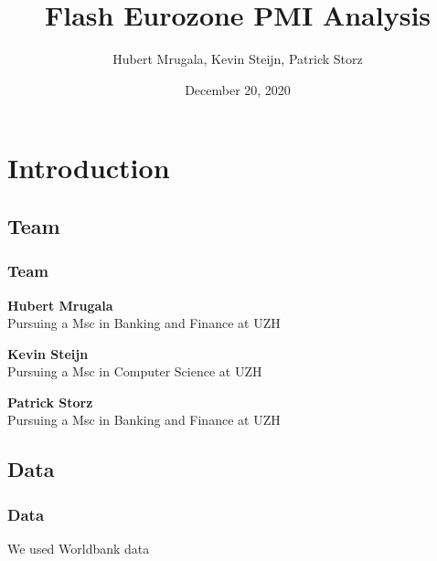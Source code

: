 \documentclass[10pt]{beamer}
\begin{document}
\title{Flash Eurozone PMI Analysis}
\author{Hubert Mrugala, Kevin Steijn, Patrick Storz}
\date{December 20, 2020} %

\begin{frame}
\titlepage
\end{frame}
\section{Introduction}
\begin{frame}
\subsection{Team}
\frametitle{Team}

\textbf{Hubert Mrugala} \\
Pursuing a Msc in Banking and Finance at UZH

\vspace{3mm}

\textbf{Kevin Steijn} \\
Pursuing a Msc in Computer Science at UZH

\vspace{3mm}

\textbf{Patrick Storz} \\
Pursuing a Msc in Banking and Finance at UZH 

\end{frame}
\begin{frame}
\subsection{Data}
\frametitle{Data}

We used Worldbank data

\end{frame}
\end{document}
